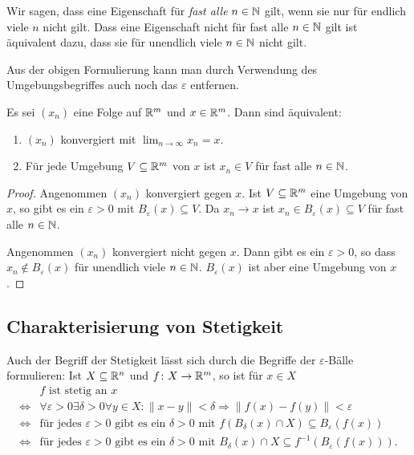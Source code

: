 \documentclass[a4paper,10pt]{article}
\begin{document}
\begin{bem}
 Wir sagen, dass eine Eigenschaft für \emph{fast alle} $n \in \mathbb{N}$ gilt, wenn sie nur für endlich viele $n$ nicht gilt. Dass eine Eigenschaft nicht für fast alle $n \in \mathbb{N}$ gilt ist äquivalent dazu, dass sie für unendlich viele $n \in \mathbb{N}$ nicht gilt.
\end{bem}


Aus der obigen Formulierung kann man durch Verwendung des Umgebungsbegriffes auch noch das $\varepsilon$ entfernen.


\begin{lem}
 Es sei $(x_n)$ eine Folge auf $\mathbb{R}^m$ und $x \in \mathbb{R}^m$. Dann sind äquivalent:
 \begin{enumerate}
  \item
   $(x_n)$ konvergiert mit $\lim_{n \to \infty} x_n = x$.
  \item
   Für jede Umgebung $V \subseteq \mathbb{R}^m$ von $x$ ist $x_n \in V$ für fast alle $n \in \mathbb{N}$.
 \end{enumerate}
\end{lem}
\begin{proof}
 Angenommen $(x_n)$ konvergiert gegen $x$. Ist $V \subseteq \mathbb{R}^m$ eine Umgebung von $x$, so gibt es ein $\varepsilon > 0$ mit $B_\varepsilon(x) \subseteq V$. Da $x_n \to x$ ist $x_n \in B_\varepsilon(x) \subseteq V$ für fast alle $n \in \mathbb{N}$.
 
 Angenommen $(x_n)$ konvergiert nicht gegen $x$. Dann gibt es ein $\varepsilon > 0$, so dass $x_n \notin B_\varepsilon(x)$ für unendlich viele $n \in \mathbb{N}$. $B_\varepsilon(x)$ ist aber eine Umgebung von $x$.
\end{proof}


\subsection{Charakterisierung von Stetigkeit}


Auch der Begriff der Stetigkeit lässt sich durch die Begriffe der $\varepsilon$-Bälle formulieren: Ist $X \subseteq \mathbb{R}^n$ und $f \colon X \to \mathbb{R}^m$, so ist für $x \in X$
\begin{align*}
                & \text{$f$ ist stetig an $x$} \\
 \Leftrightarrow& \forall \varepsilon > 0 \exists \delta > 0 \forall y \in X : \|x-y\| < \delta \Rightarrow \|f(x)-f(y)\| < \varepsilon \\
 \Leftrightarrow& \text{für jedes $\varepsilon > 0$ gibt es ein $\delta > 0$ mit $f(B_\delta(x) \cap X) \subseteq B_\varepsilon(f(x))$} \\
 \Leftrightarrow& \text{für jedes $\varepsilon > 0$ gibt es ein $\delta > 0$ mit $B_\delta(x) \cap X \subseteq f^{-1}(B_\varepsilon(f(x)))$}.
\end{align*}
\end{document}
